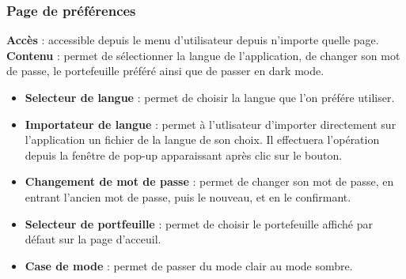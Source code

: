 \documentclass[../rapport.tex]{subfiles}
\begin{document}
\subsubsection{Page de préférences}
\noindent \textbf{Accès} : accessible depuis le menu d'utilisateur depuis n'importe quelle page. \\
\textbf{Contenu} : permet de sélectionner la langue de l'application, de changer son mot de passe, le portefeuille préféré ainsi que de passer en dark mode. 
\begin{itemize}
    \item \textbf{Selecteur de langue} : permet de choisir la langue que l'on préfére utiliser.
    \item \textbf{Importateur de langue} : permet à l'utlisateur d'importer directement sur l'application un fichier de la langue de son choix. Il effectuera l'opération depuis la fenêtre de pop-up apparaissant après clic sur le bouton.
    \item \textbf{Changement de mot de passe} : permet de changer son mot de passe, en entrant l'ancien mot de passe, puis le nouveau, et en le confirmant.
    \item \textbf{Selecteur de portfeuille} : permet de choisir le portefeuille affiché par défaut sur la page d'acceuil. 
    \item \textbf{Case de mode} : permet de passer du mode clair au mode sombre.
\end{itemize}
\end{document}
